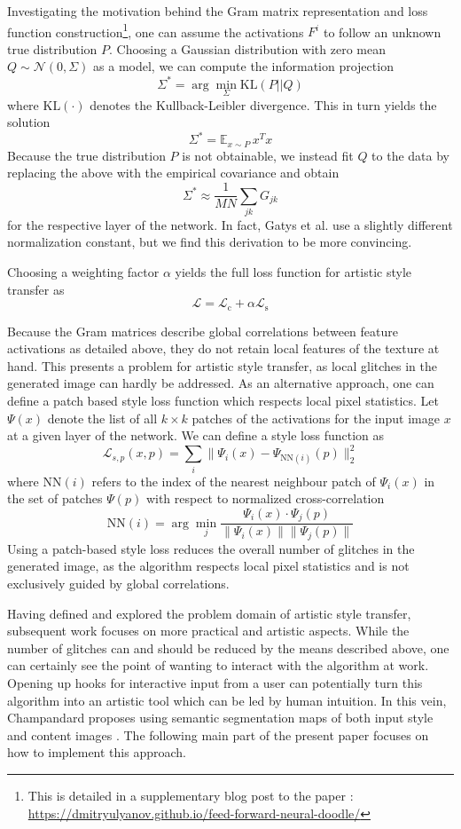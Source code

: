 Investigating the motivation behind the Gram matrix representation and loss function construction\footnote{This is detailed in a supplementary blog post to the paper \cite{ulyanov2016texture}: \url{https://dmitryulyanov.github.io/feed-forward-neural-doodle/}}, one can assume the activations \(F^i\) to follow an unknown true distribution \(P\). Choosing a Gaussian distribution with zero mean \(Q\sim \mathcal{N}(0,\Sigma)\) as a model, we can compute the information projection
\[\Sigma^\ast = \arg\min_\Sigma \text{KL}(P||Q)\]
where \(\text{KL}(\cdot)\) denotes the Kullback-Leibler divergence. This in turn yields the solution
\[\Sigma^\ast = \mathbb{E}_{x\sim P} \,x^Tx\]
Because the true distribution \(P\) is not obtainable, we instead fit \(Q\) to the data by replacing the above with the empirical covariance and obtain
\[\Sigma^\ast \approx \frac{1}{MN} \sum_{jk} G_{jk}\]
for the respective layer of the network. In fact, Gatys et al. use a slightly different normalization constant, but we find this derivation to be more convincing.

Choosing a weighting factor \(\alpha\) yields the full loss function for artistic style transfer as 
\[\mathcal{L} = \mathcal{L}_\text{c}+\alpha \mathcal{L}_\text{s}\]

Because the Gram matrices describe global correlations between feature activations as detailed above, they do not retain local features of the texture at hand. This presents a problem for artistic style transfer, as local glitches in the generated image can hardly be addressed. As an alternative approach, one can define a patch based style loss function \cite{mrf2016} which respects local pixel statistics. Let \(\Psi(x)\) denote the list of all \(k\times k\) patches of the activations for the input image \(x\) at a given layer of the network. We can define a style loss function as
\[\mathcal{L}_{s,p}(x,p) = \sum_i \|\Psi_i(x)-\Psi_{\text{NN}(i)}(p)\|_2^2\]
where \(\text{NN}(i)\) refers to the index of the nearest neighbour patch of \(\Psi_i(x)\) in the set of patches \(\Psi(p)\) with respect to normalized cross-correlation
\[\text{NN}(i) = \arg\min_{j} \frac{\Psi_i(x)\cdot \Psi_j(p)}{\|\Psi_i(x)\|\|\Psi_j(p)\|}\]
Using a patch-based style loss reduces the overall number of glitches in the generated image, as the algorithm respects local pixel statistics and is not exclusively guided by global correlations.

Having defined and explored the problem domain of artistic style transfer, subsequent work focuses on more practical and artistic aspects. While the number of glitches can and should be reduced by the means described above, one can certainly see the point of wanting to interact with the algorithm at work. Opening up hooks for interactive input from a user can potentially turn this algorithm into an artistic tool which can be led by human intuition. In this vein, Champandard proposes using semantic segmentation maps of both input style and content images \cite{doodles2016}. The following main part of the present paper focuses on how to implement this approach.
